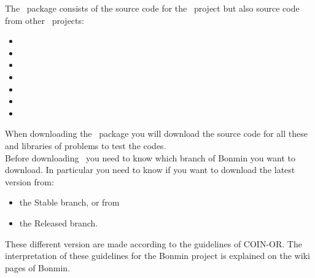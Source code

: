 \begin{PageSummary}
\end{PageSummary}

\begin{quickref}
\end{quickref}




The \Bonmin\ package consists of the source code for the \Bonmin\
project but also source code from other \COINOR\ projects:
\begin{itemize}
\item \BuildTools
\item \Cbc
\item \Cgl
\item \Clp
\item \CoinUtils
\item \Ipopt
\item \Osi
\end{itemize}

When downloading the \Bonmin\ package you will download the source code for all these and
libraries of problems to test the codes.\\

Before downloading \Bonmin\ you need to know which branch of Bonmin you want to download. 
In particular you need to know if you want to download the latest version from:
\begin{itemize}
    \item the Stable branch, or from
    \item the Released branch. 
\end{itemize}
These different version are made according to the guidelines of COIN-OR. The interpretation of these guidelines for the Bonmin project is explained on the wiki pages of Bonmin.

